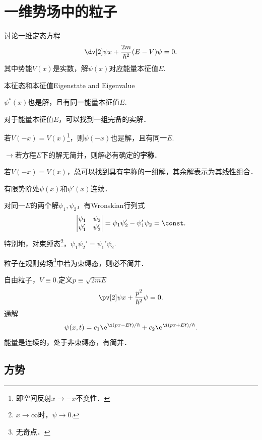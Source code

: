 \chapter[一维势场]{一维势场中的粒子}
讨论一维定态方程
\begin{align}
	\dv[2]\psi{x}+\frac{2m}{\hbar^2}(E-V)\psi=0.
\end{align}
其中势能$V(x)$是实数，解$\psi(x)$对应能量本征值$E.$
\begin{theorem}{本征态和本征值}{Eigenstate and Eigenvalue}
	\begin{compactenum}
		\item $\psi^*(x)$也是解，且有同一能量本征值$E.$
		\item 对于能量本征值$E$，可以找到一组完备的实解．
		\item 若$V(-x)=V(x)$\footnote{即空间反射$x\to-x$不变性．}，则$\psi(-x)$也是解，且有同一$E.$

		$\to$若方程$E$下的解无简并，则解必有确定的\textbf{宇称}．
		\item 若$V(-x)=V(x)$，总可以找到具有宇称的一组解，其余解表示为其线性组合．
		\item 有限势阶处$\psi(x)$和$\psi'(x)$连续．
		\item 对同一$E$的两个解$\psi_1,\psi_2$，有Wronskian行列式
		\renewcommand\arraystretch{1}
		\begin{align*}
			\begin{vmatrix}
				\psi_1  & \psi_2  \\
				\psi_1' & \psi_2'
			\end{vmatrix}=\psi_1\psi_2'-\psi_1'\psi_2=\const.
		\end{align*}
		\renewcommand\arraystretch{.82}
		特别地，对束缚态\footnote{$x\to\infty$时，$\psi\to 0.$}，$\psi_1\psi_2'=\psi_1'\psi_2.$
		\item 粒子在规则势场\footnote{无奇点．}中若为束缚态，则必不简并．
	\end{compactenum}
\end{theorem}
自由粒子，$V\equiv 0.$定义$p\equiv\sqrt{2mE}$
\[
	\pv[2]\psi{x}+\frac{p^2}{\hbar^2}\psi=0.
\]
通解
\[
	\psi(x,t)=c_1\e^{\i(px-Et)/\hbar}+c_2\e^{\i(px+Et)/\hbar}.
\]
能量是连续的，处于非束缚态，有简并．

\section{方势}
